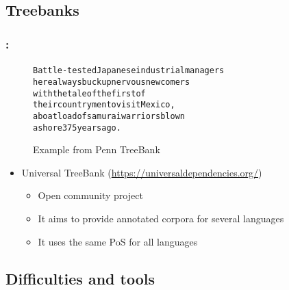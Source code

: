 \documentclass[xcolor=table]{beamer}
\begin{document}
\subsection{Treebanks}

\begin{frame}[fragile]
	\frametitle{\insertshortsubtitle: \insertsection}
	\framesubtitle{\insertsubsection}
	
	\vspace{-8pt}
	\begin{figure}
		\begin{tcolorbox}[colback=white, colframe=blue, boxrule=1pt, text width=.9\textwidth]
			\small
	\begin{alltt}
	Battle-tested Japanese industrial managers
	here always buck up nervous newcomers
	with the tale of the first of
	their countrymen to visit Mexico ,\keyword{/,}
	a boatload of samurai warriors blown
	ashore 375 years ago .
	\end{alltt}\vspace{-6pt}
	\end{tcolorbox}
	\caption{Example from Penn TreeBank \cite{2003-taylor}}
	\end{figure}
	
	\begin{itemize}
		\item Universal TreeBank (\url{https://universaldependencies.org/}) \cite{2012-petrov-al}
		\begin{itemize}
			\item Open community project
			\item It aims to provide annotated corpora for several languages
			\item It uses the same PoS for all languages
		\end{itemize}
	\end{itemize}

\end{frame}

\subsection{Difficulties and tools}
\end{document}
